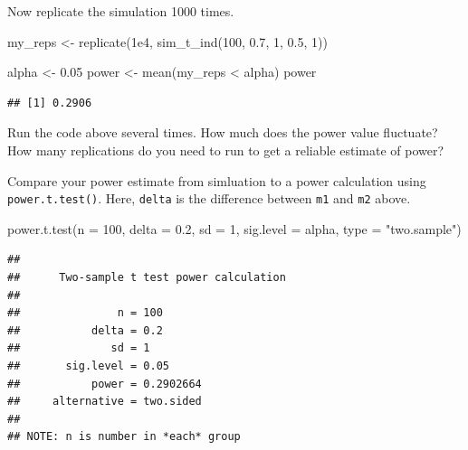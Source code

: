 \documentclass[
  oneside]{book}
\newenvironment{Shaded}{\begin{snugshade}}{\end{snugshade}}
\newcommand{\AttributeTok}[1]{\textcolor[rgb]{0.77,0.63,0.00}{#1}}
\newcommand{\DecValTok}[1]{\textcolor[rgb]{0.00,0.00,0.81}{#1}}
\newcommand{\FloatTok}[1]{\textcolor[rgb]{0.00,0.00,0.81}{#1}}
\newcommand{\FunctionTok}[1]{\textcolor[rgb]{0.00,0.00,0.00}{#1}}
\newcommand{\NormalTok}[1]{#1}
\newcommand{\OtherTok}[1]{\textcolor[rgb]{0.56,0.35,0.01}{#1}}
\newcommand{\SpecialCharTok}[1]{\textcolor[rgb]{0.00,0.00,0.00}{#1}}
\newcommand{\StringTok}[1]{\textcolor[rgb]{0.31,0.60,0.02}{#1}}
\begin{document}
Now replicate the simulation 1000 times.

\begin{Shaded}
\begin{Highlighting}[]
\NormalTok{my\_reps }\OtherTok{\textless{}{-}} \FunctionTok{replicate}\NormalTok{(}\FloatTok{1e4}\NormalTok{, }\FunctionTok{sim\_t\_ind}\NormalTok{(}\DecValTok{100}\NormalTok{, }\FloatTok{0.7}\NormalTok{, }\DecValTok{1}\NormalTok{, }\FloatTok{0.5}\NormalTok{, }\DecValTok{1}\NormalTok{))}

\NormalTok{alpha }\OtherTok{\textless{}{-}} \FloatTok{0.05}
\NormalTok{power }\OtherTok{\textless{}{-}} \FunctionTok{mean}\NormalTok{(my\_reps }\SpecialCharTok{\textless{}}\NormalTok{ alpha)}
\NormalTok{power}
\end{Highlighting}
\end{Shaded}

\begin{verbatim}
## [1] 0.2906
\end{verbatim}

\begin{try}
Run the code above several times. How much does the power value fluctuate? How many replications do you need to run to get a reliable estimate of power?

\end{try}

Compare your power estimate from simluation to a power calculation using \texttt{power.t.test()}. Here, \texttt{delta} is the difference between \texttt{m1} and \texttt{m2} above.

\begin{Shaded}
\begin{Highlighting}[]
\FunctionTok{power.t.test}\NormalTok{(}\AttributeTok{n =} \DecValTok{100}\NormalTok{, }
             \AttributeTok{delta =} \FloatTok{0.2}\NormalTok{, }
             \AttributeTok{sd =} \DecValTok{1}\NormalTok{, }
             \AttributeTok{sig.level =}\NormalTok{ alpha, }
             \AttributeTok{type =} \StringTok{"two.sample"}\NormalTok{)}
\end{Highlighting}
\end{Shaded}

\begin{verbatim}
## 
##      Two-sample t test power calculation 
## 
##               n = 100
##           delta = 0.2
##              sd = 1
##       sig.level = 0.05
##           power = 0.2902664
##     alternative = two.sided
## 
## NOTE: n is number in *each* group
\end{verbatim}
\end{document}
